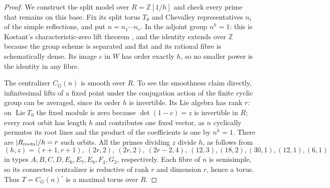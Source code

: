\begin{proof}
We construct the split model over $R=\mathbb Z[1/h]$ and check every
prime that remains on this base.  Fix its split torus $T_0$ and
Chevalley representatives $n_i$ of the simple reflections, and put
$n=n_1\cdots n_r$.  In the adjoint group $n^h=1$: this is Kostant's
characteristic-zero lift theorem \cite[Theorem 8.4]{D-Kostant1959},
and the identity extends over $\mathbb Z$ because the group scheme
is separated and flat and its rational fibre is schematically dense.
Its image $c$ in $W$ has order exactly $h$, so no smaller power is
the identity in any fibre.

The centralizer $C_G(n)$ is smooth over $R$.  To see the smoothness
claim directly, infinitesimal lifts of a fixed point under the
conjugation action of the finite cyclic group can be averaged,
since its order $h$ is invertible.  Its Lie algebra has rank $r$:
on $\operatorname{Lie}T_0$ the fixed module is zero because
$\det(1-c)=z$ is invertible in $R$; every root orbit has length $h$
and contributes one fixed vector, as $n$ cyclically permutes its
root lines and the product of the coefficients is one by $n^h=1$.
There are $|R_{\rm roots}|/h=r$ such orbits.  All the primes
dividing $z$ divide $h$, as follows from
\[
(h,z)=(r+1,r+1),\ (2r,2),\ (2r,2),\ (2r-2,4),\
(12,3),(18,2),(30,1),(12,1),(6,1)
\]
in types $A,B,C,D,E_6,E_7,E_8,F_4,G_2$, respectively.
Each fibre of $n$ is semisimple, so its connected centralizer is
reductive of rank $r$ and dimension $r$, hence a torus.  Thus
$T=C_G(n)^\circ$ is a maximal torus over $R$.


\end{proof}
